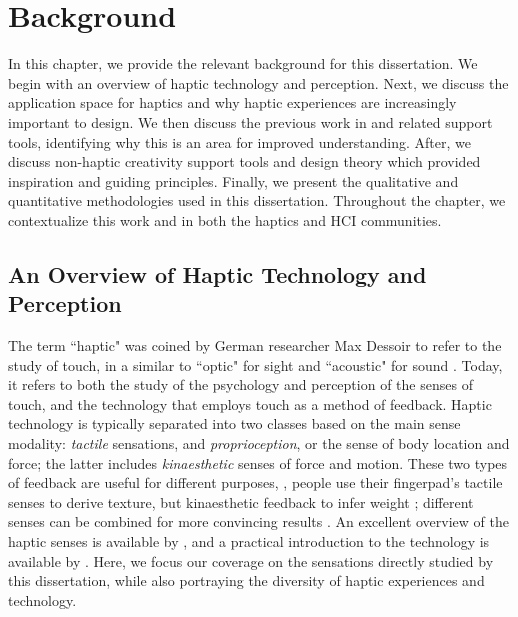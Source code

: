 
\chapter{Background}
\label{ch:rw}

In this chapter, we provide the relevant background for this dissertation.
We begin with an overview of haptic technology and perception.
Next, we discuss the application space for haptics and why haptic experiences are increasingly important to design.
We then discuss the previous work in \haxd and related support tools, identifying why this is an area for improved understanding.
After, we discuss non-haptic creativity support tools and design theory which provided inspiration and guiding principles.
Finally, we present the qualitative and quantitative methodologies used in this dissertation.
Throughout the chapter, we contextualize this work and \haxd in both the haptics and HCI communities.


%
%
\section{An Overview of Haptic Technology and Perception}
The term ``haptic" was coined by German researcher Max Dessoir to refer to the study of touch, in a similar to ``optic" for sight and ``acoustic" for sound \cite{Grunwald2008}.
Today, it refers to both the study of the psychology and perception of the senses of touch, and the technology that employs touch as a method of feedback.
Haptic technology is typically separated into two classes based on the main sense modality: \emph{tactile} sensations, and \emph{proprioception}, or the sense of body location and force;  the latter includes \emph{kinaesthetic} senses of force and motion.
These two types of feedback are useful for different purposes, \eg, people use their fingerpad's tactile senses to derive texture, but kinaesthetic feedback to infer weight \cite{Lederman1987};
different senses can be combined for more convincing results \cite{Okamura1998}.
An excellent overview of the haptic senses is available by \citet{Lederman2009survey}, and a practical introduction to the technology is available by \citet{Hayward2007}.
Here, we focus our coverage on the sensations directly studied by this dissertation, while also portraying the diversity of haptic experiences and technology.

